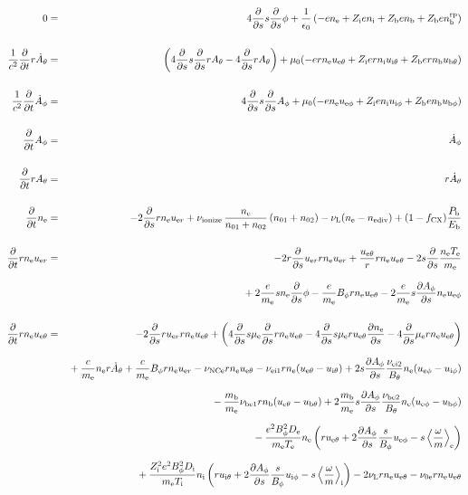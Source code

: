 \documentclass[11pt]{article}
\def\r#1{{\rm#1}}
\def\ddt{\frac{\partial}{\partial t}}
\def\dds{\frac{\partial}{\partial s}}
\def\dd#1{\frac{\partial #1}{\partial s}}
\def\ave#1{\left\langle#1\right\rangle}
\def\me{m_\r{e}}
\def\mb{m_\r{b}}
\def\mue{\mu_\r{e}}
\def\De{D_\r{e}}
\def\Di{D_\r{i}}
\def\ne{n_\r{e}}
\def\ni{n_\r{i}}
\def\nb{n_\r{b}}
\def\uer{u_{\r{e}r}}
\def\ueth{u_{\r{e}\theta}}
\def\uith{u_{\r{i}\theta}}
\def\ubth{u_{\r{b}\theta}}
\def\ueph{u_{\r{e}\phi}}
\def\uiph{u_{\r{i}\phi}}
\def\ubph{u_{\r{b}\phi}}
\def\Bth{B_\theta}
\def\Bph{B_\phi}
\def\Athd{\dot{A}_\theta}
\def\Aphd{\dot{A}_\phi}
\def\Ath{A_\theta}
\def\Aph{A_\phi}
\def\Te{T_\r{e}}
\def\Ti{T_\r{i}}
\def\nna{n_{01}}
\def\nnb{n_{02}}
\def\Zi{Z_\r{i}}
\def\Zb{Z_\r{b}}
\def\Pb{P_\r{b}}
\def\Eb{E_\r{b}}
\def\nbrp{n_\r{b}^\r{rp}}
\def\fCX{f_\r{CX}}
\def\nuNCe{\nu_\r{NCe}}
\def\nune{\nu_\r{0e}}
\def\nuL{\nu_\r{L}}
\def\nuion{\nu_\r{ionize}}
\def\nediv{n_\r{ediv}}
\begin{document}
\begin{eqnarray}
%
% 
  0 &=&
%
    4 \dds s \dds \phi
%
  + \frac{1}{\epsilon_0}
%
    \left(-e \ne + \Zi e \ni + \Zb e \nb + \Zb e \nbrp \right)
\\[5mm]
%
%
  \frac{1}{c^2} \ddt r \Athd &=&
%
    \left(   4 \dds s \dds r \Ath
%
           - 4 \dds r \Ath \right)
%
  + \mu_0 (-e r \ne \ueth + \Zi e r \ni \uith + \Zb e r \nb \ubth)
\\[5mm]
%
%
  \frac{1}{c^2} \ddt \Aphd &=&
%
    4 \dds s \dds \Aph
%
  + \mu_0 (-e \ne \ueph + \Zi e \ni \uiph + \Zb e \nb \ubph)
%
\\[5mm]
%
%
  \ddt \Aph &=&
%
  \Aphd
\\[5mm]
%
%
  \ddt r \Ath &=&
%
  r \Athd
\\[5mm]
%
%
  \ddt \ne &=&
%
  - 2 \dds r \ne \uer 
%
  + \nuion\, \frac{\ne}{\nna+\nnb}\, (\nna+\nnb)
%
  - \nuL (\ne - \nediv)
%
  + (1 - \fCX) \frac{\Pb}{\Eb}
\\[5mm]
%
%
  \ddt r \ne \uer &=&
%
  - 2 r \dds \uer r \ne \uer
%
  + \frac{\ueth}{r} r \ne \ueth
%
  - 2 s \dds \frac{\ne \Te}{\me}
\nonumber\\[3mm]&&{}
%
  + 2 \frac{e}{\me} s \ne \dds \phi
%
  - \frac{e}{\me} \Bph r \ne \ueth
%
  - 2 \frac{e}{\me} s \dd{\Aph} \ne \ueph
\\[5mm]
%
%
  \ddt r \ne \ueth &=&
%
  - 2 \dds r \uer r \ne \ueth
%
  + \left(    4 \dds s \mue \dds r \ne \ueth
%
            - 4 \dds s \mue r \ueth \dd{\ne}
%
            - 4 \dds \mue r \ne \ueth \right)
\nonumber\\[2.5mm]&&{}
%
  + \frac{e}{\me} \ne r \Athd
%
  + \frac{e}{\me} \Bph r \ne \uer
%
  - \nuNCe r \ne \ueth
%
  - \nu_\r{ei1} r \ne (\ueth - \uith)
%
  + 2 s \dd{\Aph} \frac{\nu_\r{ei2}}{\Bth} \ne (\ueph - \uiph)
\nonumber\\[2.5mm]&&{}
%
  - \frac{\mb}{\me} \nu_\r{be1} r \nb (\ueth - \ubth)
%
  + 2 \frac{\mb}{\me} s \dd{\Aph} \frac{\nu_\r{be2}}{\Bth} \ne (\ueph - \ubph)
\nonumber\\[2.5mm]&&{}
%
  - \frac{e^2 \Bph^2 \De}{\me\Te}\ne
    \left(r \ueth + 2\dd{\Aph}\frac{s}{\Bph}\ueph - s
     \ave{\frac{\omega}{m}}_\r{e} \right)
\nonumber\\[2.5mm]&&{}
%
   + \frac{\Zi^2 e^2 \Bph^2 \Di}{\me\Ti}\ni
    \left(r \uith + 2\dd{\Aph}\frac{s}{\Bph}\uiph - s
     \ave{\frac{\omega}{m}}_\r{i} \right)
%
  - 2 \nuL r \ne \ueth
%
  - \nune r \ne \ueth

\end{eqnarray}
\end{document}

